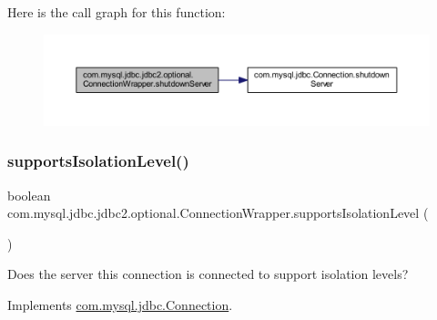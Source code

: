 Here is the call graph for this function\+:
\nopagebreak
\begin{figure}[H]
\begin{center}
\leavevmode
\includegraphics[width=350pt]{classcom_1_1mysql_1_1jdbc_1_1jdbc2_1_1optional_1_1_connection_wrapper_a23e3bc174ec3f98397698fcddc3d3ca0_cgraph}
\end{center}
\end{figure}
\mbox{\label{classcom_1_1mysql_1_1jdbc_1_1jdbc2_1_1optional_1_1_connection_wrapper_a836c27d27eac131a9226e44e4e57672f}} 
\subsubsection{\texorpdfstring{supports\+Isolation\+Level()}{supportsIsolationLevel()}}
{\footnotesize\ttfamily boolean com.\+mysql.\+jdbc.\+jdbc2.\+optional.\+Connection\+Wrapper.\+supports\+Isolation\+Level (\begin{DoxyParamCaption}{ }\end{DoxyParamCaption})}

Does the server this connection is connected to support isolation levels? 

Implements \mbox{\hyperlink{interfacecom_1_1mysql_1_1jdbc_1_1_connection_aea32f547f2d12d07de7792a6cdb20585}{com.\+mysql.\+jdbc.\+Connection}}.

